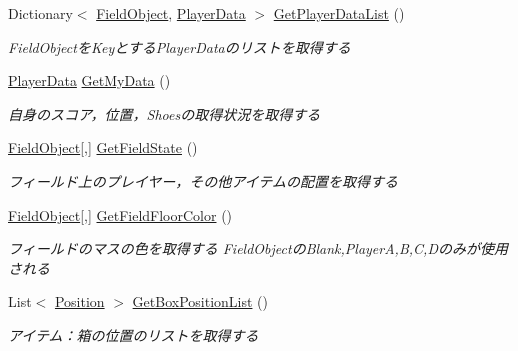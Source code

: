 \begin{DoxyCompactItemize}
\item 
Dictionary$<$ \hyperlink{namespacehoppin_1_1_game_information_a550036a5a24113f1dbc2384284a03d18}{Field\+Object}, \hyperlink{classhoppin_1_1_game_information_1_1_player_data}{Player\+Data} $>$ \hyperlink{classhoppin_1_1_game_information_1_1_abstract_player_a9846a024bb8d370a5d999c325c2bc15c}{Get\+Player\+Data\+List} ()
\begin{DoxyCompactList}\small\item\em Field\+Objectを\+Keyとする\+Player\+Dataのリストを取得する \end{DoxyCompactList}\item 
\hyperlink{classhoppin_1_1_game_information_1_1_player_data}{Player\+Data} \hyperlink{classhoppin_1_1_game_information_1_1_abstract_player_a3b588154f3bbdf1c554870fab81bfdc9}{Get\+My\+Data} ()
\begin{DoxyCompactList}\small\item\em 自身のスコア，位置，\+Shoesの取得状況を取得する \end{DoxyCompactList}\item 
\hyperlink{namespacehoppin_1_1_game_information_a550036a5a24113f1dbc2384284a03d18}{Field\+Object}\mbox{[},\mbox{]} \hyperlink{classhoppin_1_1_game_information_1_1_abstract_player_a06c81bb28f23b1ef42858eca0a7aacae}{Get\+Field\+State} ()
\begin{DoxyCompactList}\small\item\em フィールド上のプレイヤー，その他アイテムの配置を取得する \end{DoxyCompactList}\item 
\hyperlink{namespacehoppin_1_1_game_information_a550036a5a24113f1dbc2384284a03d18}{Field\+Object}\mbox{[},\mbox{]} \hyperlink{classhoppin_1_1_game_information_1_1_abstract_player_a272a85973eb706357fa685e73f08bd2b}{Get\+Field\+Floor\+Color} ()
\begin{DoxyCompactList}\small\item\em フィールドのマスの色を取得する Field\+Objectの\+Blank,PlayerA,B,C,Dのみが使用される \end{DoxyCompactList}\item 
List$<$ \hyperlink{classhoppin_1_1_game_information_1_1_position}{Position} $>$ \hyperlink{classhoppin_1_1_game_information_1_1_abstract_player_aa7c301a2cbd17786c47fa2edcc1f6814}{Get\+Box\+Position\+List} ()
\begin{DoxyCompactList}\small\item\em アイテム：箱の位置のリストを取得する \end{DoxyCompactList}\item 

\end{DoxyCompactItemize}
